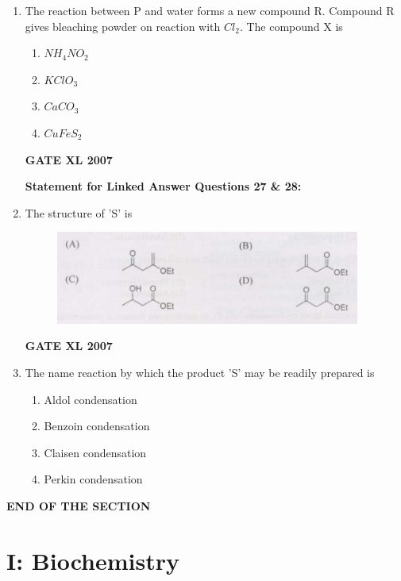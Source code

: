 \documentclass[journal,12pt,onecolumn]{IEEEtran}
\begin{document}
\begin{enumerate}
    \item The reaction between P and water forms a new compound R. Compound R gives bleaching powder on reaction with $Cl_{2}$. The compound X is 
    \begin{multicols}{4}
        \begin{enumerate} 
            \item $NH_{4}NO_{2}$
            \item $KClO_{3}$
            \item $CaCO_{3}$
            \item $CuFeS_{2}$
        \end{enumerate}
    \end{multicols}
	    \hfill \textbf{GATE XL 2007}

\textbf{Statement for Linked Answer Questions 27 \& 28:}
    \item The structure of 'S' is %
    \begin{figure}[h!]
	\centering
	\includegraphics[width=10cm]{27}
	\caption*{}
	\label{fig:Q27}
	\end{figure} 
	    \hfill \textbf{GATE XL 2007}

    \item The name reaction by which the product 'S' may be readily prepared is 
    \begin{multicols}{2}
        \begin{enumerate} 
            \item Aldol condensation
            \item Benzoin condensation
            \item Claisen condensation
            \item Perkin condensation
        \end{enumerate}
    \end{multicols}
\end{enumerate}
\begin{center}
\textbf{END OF THE SECTION}
\end{center}

\newpage

\section*{I: Biochemistry}
\end{document}
